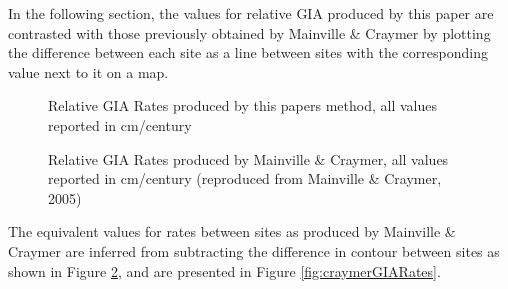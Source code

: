 
In the following section, the values for relative GIA produced by this paper are
contrasted with those previously obtained by Mainville \& Craymer by plotting the
difference between each site as a line between sites with the corresponding value
next to it on a map.

\begin{figure}[h]
	\caption{Relative GIA Rates produced by this papers method, all values reported in cm/century}
	\label{fig:myGIARates}
\end{figure}
\newpage
\begin{figure}[h]
	\caption{Relative GIA Rates produced by Mainville \& Craymer, all values reported in cm/century (reproduced from Mainville \& Craymer, 2005)}
	\label{fig:craymerGIARatesBigPlot}
\end{figure}

The equivalent values for rates between sites as produced by Mainville \& Craymer
are inferred from subtracting the difference in contour between sites as shown in
Figure \ref{fig:craymerGIARatesBigPlot}, and are presented in Figure \ref{fig:craymerGIARates}.

